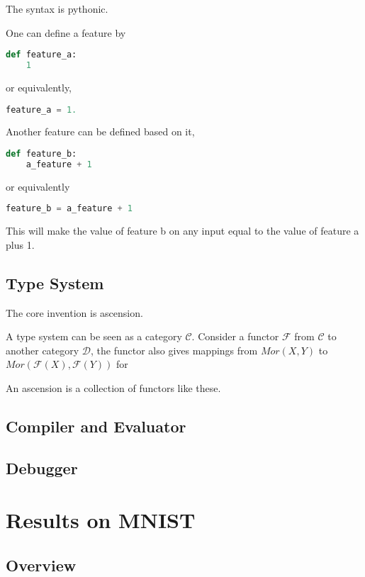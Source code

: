 \documentclass[11pt]{article} 	%
\theoremstyle{definition}
\begin{document}
The syntax is pythonic.

One can define a feature by
\begin{lstlisting}[language=Python]
def feature_a:
    1
\end{lstlisting}

or equivalently,

\begin{lstlisting}[language=Python]
feature_a = 1.
\end{lstlisting}

Another feature can be defined based on it,

\begin{lstlisting}[language=Python]
def feature_b:
    a_feature + 1
\end{lstlisting}

or equivalently

\begin{lstlisting}[language=Python]
feature_b = a_feature + 1
\end{lstlisting}

This will make the value of feature b on any input equal to the value of feature a plus 1.

\subsection{Type System}

The core invention is ascension.

A type system can be seen as a category $\mathcal{C}$. Consider a functor $\mathcal{F}$ from $\mathcal{C}$ to another category $\mathcal{D}$,
the functor also gives mappings from $Mor(X,Y)$ to $Mor(\mathcal{F}(X), \mathcal{F}(Y))$ for 

An ascension is a collection of functors like these.

\subsection{Compiler and Evaluator}

\subsection{Debugger}


\section{Results on MNIST}

\subsection{Overview}
\end{document}
